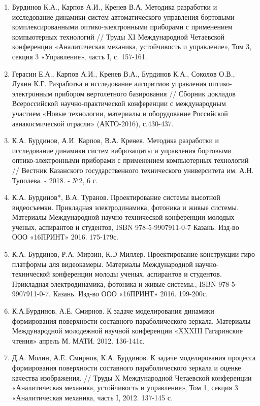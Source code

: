 \begin{enumerate}
  \item Бурдинов К.А., Карпов А.И., Кренев В.А.   Методика разработки и исследование динамики систем автоматического управления бортовыми комплексированными оптико-электронными приборами с применением компьютерных технологий // Труды XI Международной Четаевской конференции «Аналитическая механика, устойчивость и управление», Том 3, секция 3 «Управление», часть I, с. 157-161.
  \item Герасин Е.А., Карпов А.И., Кренев В.А., Бурдинов К.А., Соколов О.В., Лукин К.Г. Разработка и исследование алгоритмов управления оптико-электронным прибором вертолетного базирования // Сборник докладов Всероссийской научно-практической конференции с международным участием «Новые технологии, материалы и оборудование Российской авиакосмической отрасли» (АКТО-2016), с.430-437.
  \item К.А. Бурдинов, А.И. Карпов, В.А. Кренев. Методика разработки и исследование динамики систем виброзащиты и управления бортовыми оптико-электронными приборами с применением компьютерных технологий // Вестник Казанского государственного технического университета им. А.Н. Туполева. - 2018. - №2, 6 с.
  \item К.А. Бурдинов*, В.А. Туранов. Проектирование системы высотной видеосъемки. Прикладная электродинамика, фотоника и живые системы. Материалы Международной научно-технической конференции молодых ученых, аспирантов и студентов, ISBN 978-5-9907911-0-7
Казань. Изд-во ООО «16ПРИНТ» 2016. 175-179с.
  \item К.А. Бурдинов, Р.А. Мирзин, К.Э Миллер. Проектирование конструкции гиро платформы для видеокамеры. Материалы Международной научно-технической конференции молоды ученых, аспирантов и студентов. Прикладная электродинамика, фотоника и живые системы., ISBN 978-5-9907911-0-7. Казань. Изд-во ООО «16ПРИНТ» 2016. 199-200с.
  \item К.А.Бурдинов, А.Е. Смирнов. К задаче моделирования динамики формирования поверхности составного параболического зеркала. Материалы Международной молодежной научной конференции «XXXIII Гагаринские чтения» апрель М. МАТИ. 2012. 136-141с.
  \item Д.А. Молин, А.Е. Смирнов, К.А. Бурдинов. К задаче моделирования процесса формирования поверхности составного параболического зеркала и оценке качества изображения. // Труды X Международной Четаевской конференции «Аналитическая механика, устойчивость и управление», Том 1, секция 3 «Аналитическая механика, часть I, 2012. 137-145 с.

\end{enumerate}
